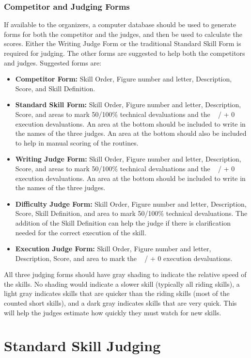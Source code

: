 \subsection{Competitor and Judging Forms}
If available to the organizers, a computer database should be used to generate forms for both the competitor and the judges, and then be used to calculate the scores.
Either the Writing Judge Form or the traditional Standard Skill Form is required for judging.
The other forms are suggested to help both the competitors and judges.
Suggested forms are:
\begin{itemize}
\item \textbf{Competitor Form:} Skill Order, Figure number and letter, Description, Score, and Skill Definition.
\item \textbf{Standard Skill Form:} Skill Order, Figure number and letter, Description, Score, and areas to mark 50/100\% technical devaluations and the ~ / + 0 execution devaluations.
An area at the bottom should be included to write in the names of the three judges.
An area at the bottom should also be included to help in manual scoring of the routines.
\item \textbf{Writing Judge Form:} Skill Order, Figure number and letter, Description, Score, and areas to mark 50/100\% technical devaluations and the ~ / + 0 execution devaluations.
An area at the bottom should be included to write in the names of the three judges.
\item \textbf{Difficulty Judge Form:} Skill Order, Figure number and letter, Description, Score, Skill Definition, and area to mark 50/100\% technical devaluations.
The addition of the Skill Definition can help the judge if there is clarification needed for the correct execution of the skill.
\item \textbf{Execution Judge Form:} Skill Order, Figure number and letter, Description, Score, and area to mark the ~ / + 0 execution devaluations.
\end{itemize}

All three judging forms should have gray shading to indicate the relative speed of the skills.
No shading would indicate a slower skill (typically all riding skills), a light gray indicates skills that are quicker than the riding skills (most of the counted short skills), and a dark gray indicates skills that are very quick.
This will help the judges estimate how quickly they must watch for new skills.

\chapter{Standard Skill Judging}

